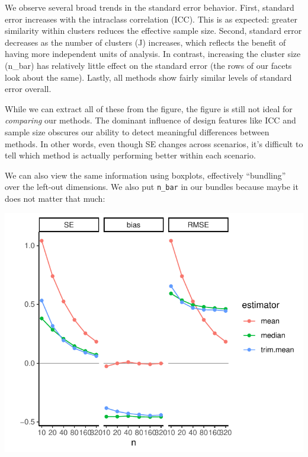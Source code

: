 \documentclass[
]{book}
\newenvironment{Shaded}{\begin{snugshade}}{\end{snugshade}}
\newcommand{\AttributeTok}[1]{\textcolor[rgb]{0.13,0.29,0.53}{#1}}
\newcommand{\ConstantTok}[1]{\textcolor[rgb]{0.56,0.35,0.01}{#1}}
\newcommand{\FloatTok}[1]{\textcolor[rgb]{0.00,0.00,0.81}{#1}}
\newcommand{\FunctionTok}[1]{\textcolor[rgb]{0.13,0.29,0.53}{\textbf{#1}}}
\newcommand{\NormalTok}[1]{#1}
\newcommand{\SpecialCharTok}[1]{\textcolor[rgb]{0.81,0.36,0.00}{\textbf{#1}}}
\begin{document}
We observe several broad trends in the standard error behavior.
First, standard error increases with the intraclass correlation (ICC).
This is as expected: greater similarity within clusters reduces the effective sample size.
Second, standard error decreases as the number of clusters (J) increases, which reflects the benefit of having more independent units of analysis.
In contrast, increasing the cluster size (n\_bar) has relatively little effect on the standard error (the rows of our facets look about the same).
Lastly, all methods show fairly similar levels of standard error overall.

While we can extract all of these from the figure, the figure is still not ideal for \emph{comparing} our methods.
The dominant influence of design features like ICC and sample size obscures our ability to detect meaningful differences between methods.
In other words, even though SE changes across scenarios, it's difficult to tell which method is actually performing better within each scenario.

We can also view the same information using boxplots, effectively ``bundling'' over the left-out dimensions.
We also put \texttt{n\_bar} in our bundles because maybe it does not matter that much:

\begin{Shaded}
\end{Shaded}

\begin{center}\includegraphics[width=0.75\linewidth]{Designing-Simulations-in-R_files/figure-latex/unnamed-chunk-178-1} \end{center}
\end{document}

